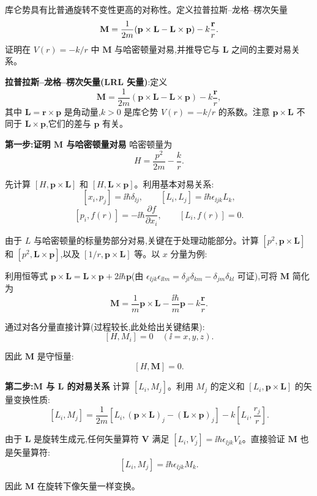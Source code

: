 \begin{question}
库仑势具有比普通旋转不变性更高的对称性。定义拉普拉斯--龙格--楞次矢量
\[
\mathbf M={1\over2m}(\mathbf p\times\mathbf L-\mathbf L\times\mathbf p)-k{\mathbf r\over r}.
\]
证明在 $V(r)=-k/r$ 中 $\mathbf M$ 与哈密顿量对易,并推导它与 $\mathbf L$ 之间的主要对易关系。
\begin{solution}
	\textbf{拉普拉斯--龙格--楞次矢量(LRL 矢量)}:定义
	\[
	\mathbf M = \frac{1}{2m}(\mathbf p\times\mathbf L - \mathbf L\times\mathbf p) - k\frac{\mathbf r}{r},
	\]
	其中 $\mathbf L=\mathbf r\times\mathbf p$ 是角动量,$k>0$ 是库仑势 $V(r)=-k/r$ 的系数。注意 $\mathbf p\times\mathbf L$ 不同于 $\mathbf L\times\mathbf p$,它们的差与 $\mathbf p$ 有关。

	\textbf{第一步:证明 $\mathbf M$ 与哈密顿量对易} 哈密顿量为
	\[
	H = \frac{p^2}{2m} - \frac{k}{r}.
	\]

	先计算 $[H,\mathbf p\times\mathbf L]$ 和 $[H,\mathbf L\times\mathbf p]$。利用基本对易关系:
	\[
	[x_i,p_j] = \ii\hbar\delta_{\ii j},\qquad [L_i,L_j]=\ii\hbar\epsilon_{\ii jk}L_k,
	\]
	\[
	[p_i,f(r)] = -\ii\hbar\frac{\partial f}{\partial x_i},\qquad
	[L_i,f(r)] = 0.
	\]

	由于 $L$ 与哈密顿量的标量势部分对易,关键在于处理动能部分。计算 $[p^2,\mathbf p\times\mathbf L]$ 和 $[p^2,\mathbf L\times\mathbf p]$,以及 $[1/r,\mathbf p\times\mathbf L]$ 等。以 $x$ 分量为例:

	利用恒等式 $\mathbf p\times\mathbf L = \mathbf L\times\mathbf p + 2\ii\hbar\mathbf p$(由 $\epsilon_{\ii jk}\epsilon_{\ii lm}=\delta_{jl}\delta_{km}-\delta_{jm}\delta_{kl}$ 可证),可将 $\mathbf M$ 简化为
	\[
	\mathbf M = \frac{1}{m}\mathbf p\times\mathbf L - \frac{\ii\hbar}{m}\mathbf p - k\frac{\mathbf r}{r}.
	\]

	通过对各分量直接计算(过程较长,此处给出关键结果):
	\[
	[H,M_i] = 0\quad (\ii=x,y,z).
	\]

	因此 $\mathbf M$ 是守恒量:
	\[
	\boxed{[H,\mathbf M]=0}.
	\]

	\textbf{第二步:$\mathbf M$ 与 $\mathbf L$ 的对易关系} 计算 $[L_i,M_j]$。利用 $M_j$ 的定义和 $[L_i,\mathbf p\times\mathbf L]$ 的矢量变换性质:
	\[
	[L_i,M_j] = \frac{1}{2m}[L_i,(\mathbf p\times\mathbf L)_j - (\mathbf L\times\mathbf p)_j] - k\left[L_i,\frac{r_j}{r}\right].
	\]

	由于 $\mathbf L$ 是旋转生成元,任何矢量算符 $\mathbf V$ 满足 $[L_i,V_j]=\ii\hbar\epsilon_{\ii jk}V_k$。直接验证 $\mathbf M$ 也是矢量算符:
	\[
	[L_i,M_j] = \ii\hbar\epsilon_{\ii jk}M_k.
	\]

	因此 $\mathbf M$ 在旋转下像矢量一样变换。


\end{solution}
\end{question}
